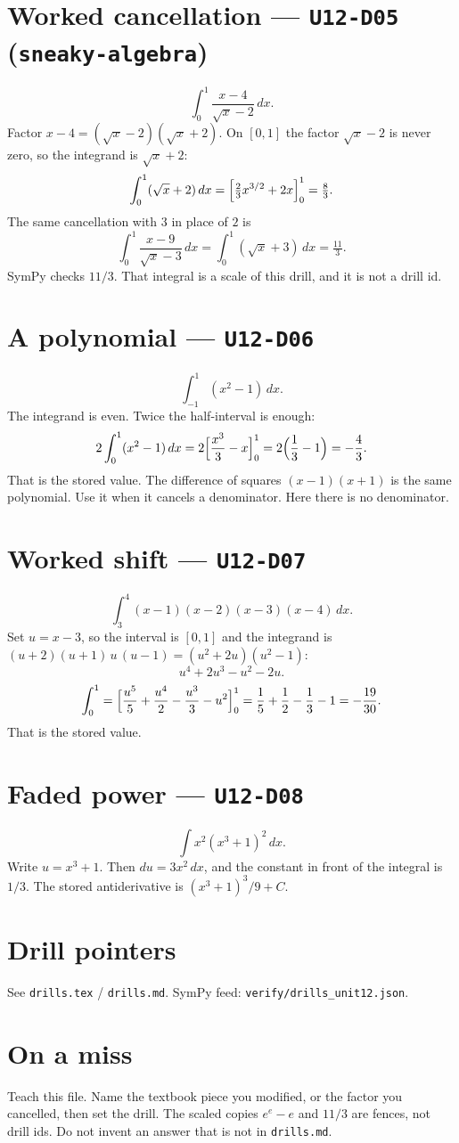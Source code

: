 \section{Worked cancellation --- \texttt{U12-D05} (\texttt{sneaky-algebra})}
\[
\int_{0}^{1}\frac{x-4}{\sqrt{x}-2}\,dx.
\]
Factor $x-4=(\sqrt{x}-2)(\sqrt{x}+2)$. On $[0,1]$ the factor $\sqrt{x}-2$ is never zero, so the integrand is $\sqrt{x}+2$:
\[
\int_{0}^{1}(\sqrt{x}+2)\,dx=\Bigl[\tfrac23 x^{3/2}+2x\Bigr]_{0}^{1}=\tfrac83.
\]
The same cancellation with $3$ in place of $2$ is
\[
\int_{0}^{1}\frac{x-9}{\sqrt{x}-3}\,dx=\int_{0}^{1}(\sqrt{x}+3)\,dx=\tfrac{11}{3}.
\]
SymPy checks $11/3$. That integral is a scale of this drill, and it is not a drill id.

\section{A polynomial --- \texttt{U12-D06}}
\[
\int_{-1}^{1}(x^{2}-1)\,dx.
\]
The integrand is even. Twice the half-interval is enough:
\[
2\int_{0}^{1}(x^{2}-1)\,dx=2\Bigl[\frac{x^{3}}{3}-x\Bigr]_{0}^{1}=2\Bigl(\frac13-1\Bigr)=-\frac43.
\]
That is the stored value. The difference of squares $(x-1)(x+1)$ is the same polynomial. Use it when it cancels a denominator. Here there is no denominator.

\section{Worked shift --- \texttt{U12-D07}}
\[
\int_{3}^{4}(x-1)(x-2)(x-3)(x-4)\,dx.
\]
Set $u=x-3$, so the interval is $[0,1]$ and the integrand is $(u+2)(u+1)\,u\,(u-1)=(u^{2}+2u)(u^{2}-1)$:
\[
u^{4}+2u^{3}-u^{2}-2u.
\]
\[
\int_{0}^{1}=\Bigl[\frac{u^{5}}{5}+\frac{u^{4}}{2}-\frac{u^{3}}{3}-u^{2}\Bigr]_{0}^{1}=\frac15+\frac12-\frac13-1=-\frac{19}{30}.
\]
That is the stored value.

\section{Faded power --- \texttt{U12-D08}}
\[
\int x^{2}(x^{3}+1)^{2}\,dx.
\]
Write $u=x^{3}+1$. Then $du=3x^{2}\,dx$, and the constant in front of the integral is $1/3$. The stored antiderivative is $(x^{3}+1)^{3}/9+C$.

\section{Drill pointers}
See \texttt{drills.tex} / \texttt{drills.md}. SymPy feed: \texttt{verify/drills\_unit12.json}.

\section*{On a miss}
Teach this file. Name the textbook piece you modified, or the factor you cancelled, then set the drill. The scaled copies $e^{e}-e$ and $11/3$ are fences, not drill ids. Do not invent an answer that is not in \texttt{drills.md}.

